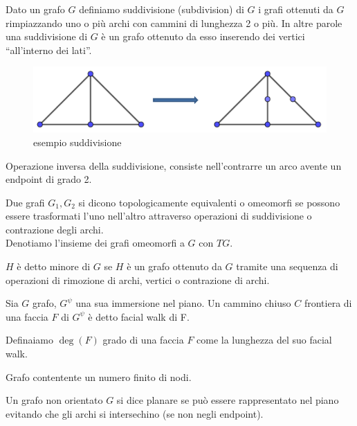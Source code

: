 \begin{definizione}[Suddivisione]
    Dato un grafo \(G\) definiamo suddivisione (subdivision) di \(G\) i grafi ottenuti da \(G\) rimpiazzando uno o più archi con cammini di lunghezza 2 o più. In altre parole una suddivisione di \(G\) è un grafo ottenuto da esso inserendo dei vertici “all'interno dei lati”.
\end{definizione}
\begin{figure}[H]
    \centering
    \includegraphics[scale=0.6]{img/suddivisione.PNG}
    \caption{esempio suddivisione}
\end{figure}
\begin{definizione}[Contrazione]
    Operazione inversa della suddivisione, consiste nell'contrarre un arco avente un endpoint di grado 2.
\end{definizione}

\begin{definizione}
    Due grafi \(G_1,G_2\) si dicono topologicamente equivalenti o omeomorfi se possono essere trasformati l'uno nell'altro attraverso operazioni di suddivisione o contrazione degli archi.
    \\ Denotiamo l'insieme dei grafi omeomorfi a \(G\) con \(TG\).
\end{definizione}

\begin{definizione}[Minore]
    \(H\) è detto minore di \(G\) se \(H\) è un grafo ottenuto da \(G\) tramite una sequenza di operazioni di rimozione di archi, vertici o contrazione di archi.
\end{definizione}

\begin{definizione}
    Sia \(G\) grafo, \(G^\psi\) una sua immersione nel piano. Un cammino chiuso \(C\) frontiera di una faccia \(F\) di \(G^\psi\) è detto facial walk di F.
\end{definizione}

\begin{definizione}
    Definaiamo \(\deg(F)\) grado di una faccia \(F\) come la lunghezza del suo facial walk.
\end{definizione}
\begin{definizione}
    Grafo contentente un numero finito di nodi.
\end{definizione}
\begin{definizione}
    Un grafo non orientato \(G\) si dice planare se può essere rappresentato nel piano evitando che gli archi si intersechino (se non negli endpoint).
\end{definizione}
